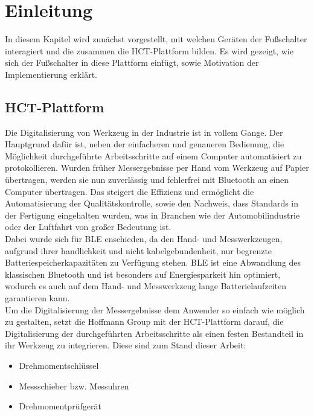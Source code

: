 \section{Einleitung}
In diesem Kapitel wird zunächst vorgestellt, mit welchen Geräten der Fußschalter interagiert und die zusammen die \ac{HCT}-Plattform bilden. Es wird gezeigt, wie sich der Fußschalter in diese Plattform einfügt, sowie Motivation der Implementierung erklärt.

\subsection{HCT-Plattform}
Die Digitalisierung von Werkzeug in der Industrie ist in vollem Gange. Der Hauptgrund dafür ist, neben der einfacheren und genaueren Bedienung, die Möglichkeit durchgeführte Arbeitsschritte auf einem Computer automatisiert zu protokollieren. Wurden früher Messergebnisse per Hand vom Werkzeug auf Papier übertragen, werden sie nun zuverlässig und fehlerfrei mit Bluetooth an einen Computer übertragen. Das steigert die Effizienz und ermöglicht die Automatisierung der Qualitätskontrolle, sowie den Nachweis, dass Standards in der Fertigung eingehalten wurden, was in Branchen wie der Automobilindustrie oder der Luftfahrt von großer Bedeutung ist. \\
Dabei wurde sich für \ac{BLE} enschieden, da den Hand- und Messwerkzeugen, aufgrund ihrer handlichkeit und nicht kabelgebundenheit, nur begrenzte Batteriespeicherkapazitäten zu Verfügung stehen. \ac{BLE} ist eine Abwandlung des klassischen Bluetooth und ist besonders auf Energiesparkeit hin optimiert, wodurch es auch auf dem Hand- und Messwerkzeug lange Batterielaufzeiten garantieren kann.\\
Um die Digitalisierung der Messergebnisse dem Anwender so einfach wie möglich zu gestalten, setzt die Hoffmann Group mit der HCT-Plattform darauf, die Digitalisierung der durchgeführten Arbeitsschritte als einen festen Bestandteil in ihr Werkzeug zu integrieren. Diese sind zum Stand dieser Arbeit: 
\begin{itemize}
	\item Drehmomentschlüssel
	\item Messschieber bzw. Messuhren
	\item Drehmomentprüfgerät
\end{itemize}
